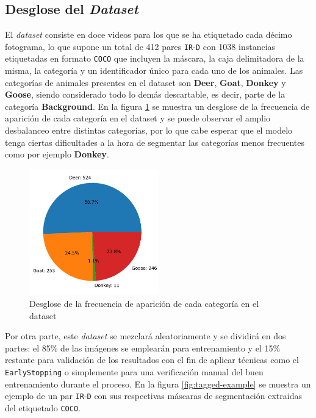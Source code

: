 \documentclass[12pt,a4paper]{report}
\begin{document}
\subsection{Desglose del \textit{Dataset}}
El \textit{dataset} consiste en doce videos para los que se ha etiquetado cada décimo fotograma, lo que supone un total de 412 pares \texttt{IR}-\texttt{D} con 1038 instancias etiquetadas en formato \texttt{COCO} que incluyen la máscara, la caja delimitadora de la misma, la categoría y un identificador único para cada uno de los animales. Las categorías de animales presentes en el dataset son \textbf{Deer}, \textbf{Goat}, \textbf{Donkey} y \textbf{Goose}, siendo considerado todo lo demás descartable, es decir, parte de la categoría \textbf{Background}. En la figura \ref{fig:dataset-breakdown} se muestra un desglose de la frecuencia de aparición de cada categoría en el dataset y se puede observar el amplio desbalanceo entre distintas categorías, por lo que cabe esperar que el modelo tenga ciertas dificultades a la hora de segmentar las categorías menos frecuentes como por ejemplo \textbf{Donkey}.
\begin{figure}[!h]
    \centering
    \includegraphics[width=0.5\textwidth]{media/data/dataset_breakdown.png}
    \caption{Desglose de la frecuencia de aparición de cada categoría en el dataset}
    \label{fig:dataset-breakdown}
\end{figure}
Por otra parte, este \textit{dataset} se mezclará aleatoriamente y se dividirá en dos partes: el 85\% de las imágenes se emplearán para entrenamiento y el 15\% restante para validación de los resultados con el fin de aplicar técnicas como el \texttt{EarlyStopping} o simplemente para una verificación manual del buen entrenamiento durante el proceso. En la figura \ref{fig:tagged-example} se muestra un ejemplo de un par \texttt{IR}-\texttt{D} con sus respectivas máscaras de segmentación extraidas del etiquetado \texttt{COCO}.
\end{document}
